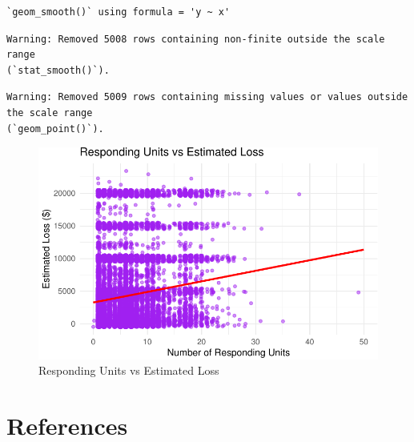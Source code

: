 \documentclass[
  letterpaper,
  DIV=11,
  numbers=noendperiod]{scrartcl}
\newenvironment{Shaded}{\begin{snugshade}}{\end{snugshade}}
\newcommand{\AttributeTok}[1]{\textcolor[rgb]{0.40,0.45,0.13}{#1}}
\newcommand{\ConstantTok}[1]{\textcolor[rgb]{0.56,0.35,0.01}{#1}}
\newcommand{\DecValTok}[1]{\textcolor[rgb]{0.68,0.00,0.00}{#1}}
\newcommand{\FloatTok}[1]{\textcolor[rgb]{0.68,0.00,0.00}{#1}}
\newcommand{\FunctionTok}[1]{\textcolor[rgb]{0.28,0.35,0.67}{#1}}
\newcommand{\NormalTok}[1]{\textcolor[rgb]{0.00,0.23,0.31}{#1}}
\newcommand{\SpecialCharTok}[1]{\textcolor[rgb]{0.37,0.37,0.37}{#1}}
\newcommand{\StringTok}[1]{\textcolor[rgb]{0.13,0.47,0.30}{#1}}
\begin{document}
\begin{Shaded}
\end{Shaded}

\begin{verbatim}
`geom_smooth()` using formula = 'y ~ x'
\end{verbatim}

\begin{verbatim}
Warning: Removed 5008 rows containing non-finite outside the scale range
(`stat_smooth()`).
\end{verbatim}

\begin{verbatim}
Warning: Removed 5009 rows containing missing values or values outside the scale range
(`geom_point()`).
\end{verbatim}

\begin{figure}[H]

{\centering \includegraphics{paper_files/figure-pdf/fig-responding-units-loss-1.pdf}

}

\caption{\label{fig-responding-units-loss}Responding Units vs Estimated
Loss}

\end{figure}

\hypertarget{references}{%
\section{References}\label{references}}
\end{document}
